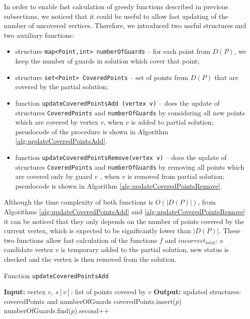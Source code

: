 \documentclass[runningheads,a4paper]{elsarticle}
\begin{document}
	In order to enable fast calculation of greedy functions described in previous subsections, we noticed that it could be useful to allow fast updating of the number of uncovered vertices. Therefore, we introduced two useful structures and two auxiliary functions:
	\begin{itemize}
		\item structure \texttt{map<Point,int> numberOfGuards} -- for each point from $D(P)$,  we keep the number of guards in solution which cover that point;
		\item structure \texttt{set<Point> CoveredPoints} -- set of points from $D(P)$ that are covered by the partial solution;
		\item function \texttt{updateCoveredPointsAdd (vertex v)} -- does the update of  structures \texttt{CoveredPoints} and \texttt{numberOfGuards} by considering all new points which are covered by vertex $v$, when $v$  is added to partial solution; pseudocode of the procedure is shown in Algorithm \ref{alg:updateCoveredPointsAdd}.
		\item function \texttt{updateCoveredPointsRemove(vertex v)} -- does the update of structures \texttt{CoveredPoints} and \texttt{numberOfGuards} by removing all points which are covered only by guard $v$ , when $v$ is removed from partial solution; pseudocode  is shown in Algorithm \ref{alg:updateCoveredPointsRemove}.
	\end{itemize}
 Although the time complexity of both functions is $O(|D(P)|)$, from Algorithms \ref{alg:updateCoveredPointsAdd} and \ref{alg:updateCoveredPointsRemove} it can be noticed that they only depends on the number of points covered by the current vertex, which is expected to be significantly lower than $|D(P)|$. These two functions allow fast calculation of the functions $f$ and  $incorrect_{total}$: a candidate vertex $v$ is temporary added to the partial solution, new status is checked and the vertex is then removed from the solution.
	\begin{algorithm}[!t]
          	\caption{Function \texttt{updateCoveredPointsAdd}}\label{alg:updateCoveredPointsAdd}
          	\begin{algorithmic}[1]
          		\State \textbf{Input:} vertex $v$, $s[v]$:  list of points covered by $v$
          		\State \textbf{Output:} updated structures: coveredPoints and numberOfGuards
          		\State coveredPoints.insert($p$)
          		\State numberOfGuards.find($p$).second++
          		\EndFor
          	\end{algorithmic}
          \end{algorithm}
\end{document}
